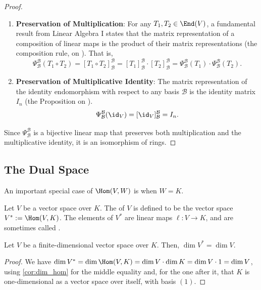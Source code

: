 \begin{proof}
  \begin{enumerate}
    \item \textbf{Preservation of Multiplication}: For any $T_1, T_2 \in \End(V)$, a fundamental result from Linear Algebra I states that the matrix representation of a composition of linear maps is the product of their matrix representations (the composition rule, on ). That is,
    \[ \Psi_{\mathcal{B}}^{\mathcal{B}}(T_1 \circ T_2) = [T_1 \circ T_2]_{\mathcal{B}}^{\mathcal{B}} = [T_1]_{\mathcal{B}}^{\mathcal{B}} \cdot [T_2]_{\mathcal{B}}^{\mathcal{B}} = \Psi_{\mathcal{B}}^{\mathcal{B}}(T_1) \cdot \Psi_{\mathcal{B}}^{\mathcal{B}}(T_2). \]
    \item \textbf{Preservation of Multiplicative Identity}: The matrix representation of the identity endomorphism with respect to any basis $\mathcal{B}$ is the identity matrix $I_n$ (the Proposition on ).
    \[ \Psi_{\mathcal{B}}^{\mathcal{B}}(\id_V) = [\id_V]_{\mathcal{B}}^{\mathcal{B}} = I_n. \]
  \end{enumerate}
  Since $\Psi_{\mathcal{B}}^{\mathcal{B}}$ is a bijective linear map that preserves both multiplication and the multiplicative identity, it is an isomorphism of rings.
\end{proof}


\subsection{The Dual Space}
An important special case of $\Hom(V,W)$ is when $W=K$.

\begin{definition}
  \label{def:dual_space}
  Let $V$ be a vector space over $K$. The  of $V$ is defined to be the vector space $V^* := \Hom(V,K)$. The elements of $V^*$ are linear maps $\ell \colon V \to K$, and are sometimes called .
\end{definition}

\begin{corollary}
  \label{cor:dim_dual}
  Let $V$ be a finite-di\-men\-sional vector space over $K$. Then, $\dim V^* = \dim V$.
\end{corollary}

\begin{proof}
  We have $\dim V^* = \dim \Hom(V,K) = \dim V \cdot \dim K = \dim V \cdot 1 = \dim V$, using \cref{cor:dim_hom} for the middle equality and, for the one after it, that $K$ is one-dimensional as a vector space over itself, with basis $(1)$.
\end{proof}

